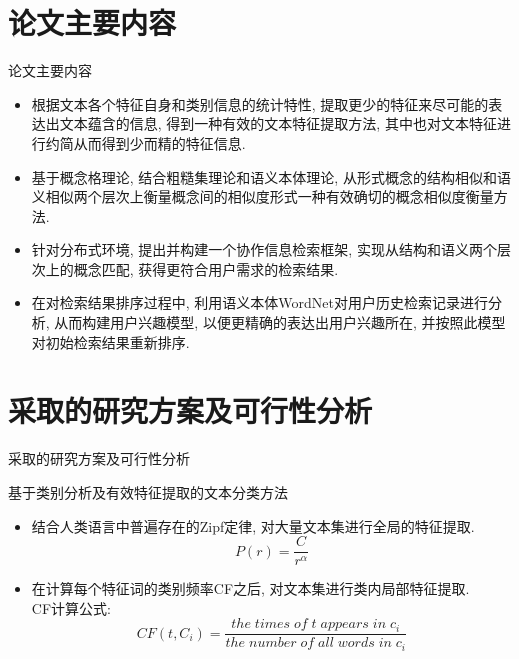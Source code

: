 \documentclass[dvipdfm]{beamer}
\begin{document}
\section{论文主要内容}
\begin{frame}[t]{论文主要内容}
  \begin{block}{}
    \begin{itemize}
    \item 根据文本各个特征自身和类别信息的统计特性, 提取更少的特征来尽可能的表达出文本蕴含的信息, 得到一种有效的文本特征提取方法, 其中也对文本特征进行约简从而得到少而精的特征信息.\pause
    \item 基于\alert{概念格理论}, 结合\alert{粗糙集理论}和\alert{语义本体理论}, 从形式概念的结构相似和语义相似两个层次上衡量概念间的相似度形式一种有效确切的概念相似度衡量方法.\pause
    \item 针对分布式环境, 提出并构建一个协作信息检索框架, 实现\alert{从结构和语义}两个层次上的概念匹配, 获得更符合用户需求的检索结果.\pause
    \item 在对检索结果排序过程中, 利用\alert{语义本体WordNet}对用户历史检索记录进行分析, 从而构建用户兴趣模型, 以便更精确的表达出用户兴趣所在, 并按照此模型对初始检索结果重新排序.
    \end{itemize}
  \end{block}
\end{frame}

\section{采取的研究方案及可行性分析}
\begin{frame}[t]{采取的研究方案及可行性分析}
  \begin{block}{基于类别分析及有效特征提取的文本分类方法}
    \begin{itemize}
    \item 结合人类语言中普遍存在的\alert{Zipf定律}, 对大量文本集进行全局的特征提取. $$ P(r)=\frac{C}{r^\alpha}$$ \pause 
    \item 在计算每个特征词的类别频率CF之后, 对文本集进行类内局部特征提取. \\ \small{CF计算公式: $$ CF(t, C_i)=\frac{the\; times\; of\; t\; appears\; in\; c_i}{the\; number\; of\; all\; words\; in\; c_i} $$ }
    \end{itemize}
  \end{block}
\end{frame}
\end{document}
